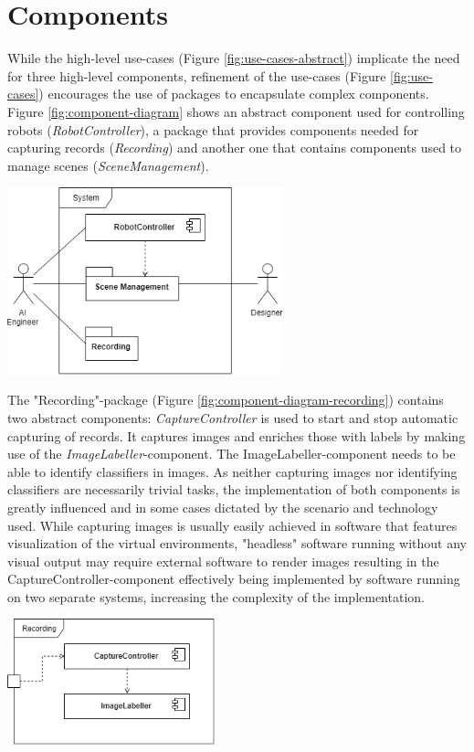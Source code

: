 \section{Components}
While the high-level use-cases (Figure \ref{fig:use-cases-abstract}) implicate the need for three high-level components, refinement of the use-cases (Figure \ref{fig:use-cases}) encourages the use of packages to encapsulate complex components. Figure \ref{fig:component-diagram} shows an abstract component used for controlling robots (\textit{RobotController}), a package that provides components needed for capturing records (\textit{Recording}) and another one that contains components used to manage scenes (\textit{SceneManagement}).
\begin{center}
\noindent\includegraphics[width=8cm]{tex/img/ch04/ComponentDiagram_System01.png}
\label{fig:component-diagram}
\end{center}
The "Recording"-package (Figure \ref{fig:component-diagram-recording}) contains two abstract components: \textit{CaptureController} is used to start and stop automatic capturing of records. It captures images and enriches those with labels by making use of the \textit{ImageLabeller}-component. The ImageLabeller-component needs to be able to identify classifiers in images. As neither capturing images nor identifying classifiers are necessarily trivial tasks, the implementation of both components is greatly influenced and in some cases dictated by the scenario and technology used. While capturing images is usually easily achieved in software that features visualization of the virtual environments, "headless" software running without any visual output may require external software to render images resulting in the CaptureController-component effectively being implemented by software running on two separate systems, increasing the complexity of the implementation.
\begin{center}
\noindent\includegraphics[width=6cm]{tex/img/ch04/ComponentDiagram_Recording04.png}
\label{fig:component-diagram-recording}
\end{center}
